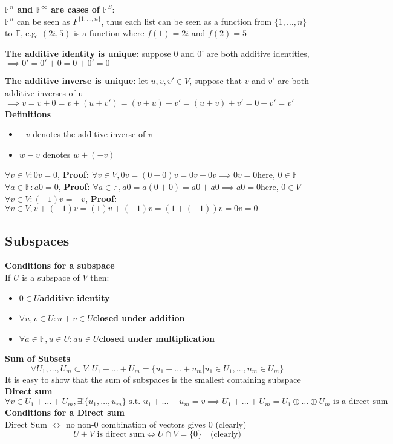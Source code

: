 \documentclass{article}
\newcommand{\0}{{\bf{0}}}
\begin{document}
{\textbf{$\mathbb{F}^n$ and $\mathbb{F}^{\infty}$ are cases of $\mathbb{F}^S:$ }}\\
$\mathbb{F}^n$ can be seen as $F^{\{1,\dots,n\}}$, thus each list can be seen as a function from $\{1,\dots,n\}$ to $\mathbb{F}$, e.g. $(2i,5)$ is a function where $f(1) = 2i$ and $f(2) = 5$

{\textbf{The additive identity is unique:}} suppose 0 and 0' are both additive identities, $\implies0'=0'+0=0+0'=0$

{\textbf{The additive inverse is unique:}} let $u,v,v'\in{}V$, suppose that $v$ and $v'$ are both additive inverses of u $\implies{}v=v+0=v+(u+v')=(v+u)+v'=(u+v)+v'=0+v'=v'$\\
{\textbf{Definitions}}
\begin{itemize}
    \item $-v$ denotes the additive inverse of $v$
    \item $w-v$ denotes $w+(-v)$
\end{itemize}
$\forall{}v\in{}V:0v=0$, {\textbf{Proof:}} $\forall{}v\in{}V,0v=(0+0)v=0v+0v\implies0v=0$\null\hfill{here, $0\in\mathbb{F}$}\\
$\forall{}a\in{}\mathbb{F}:a0=0$, {\textbf{Proof:}} $\forall{}a\in{}\mathbb{F},a0=a(0+0)=a0+a0\implies{}a0=0$\null\hfill{here, $0\in{}V$}\\
$\forall{}v\in{}V:(-1)v=-v$, {\textbf{Proof:}} $\forall{}v\in{}V,v+(-1)v=(1)v+(-1)v=(1+(-1))v=0v=0$
\subsection{Subspaces}
{\textbf{Conditions for a subspace}}\\
If $U$ is a subspace of $V$ then:
\begin{itemize}
    \item $0\in{}U$\null\hfill{\textbf{additive identity}}
    \item $\forall{}u,v\in{}U:u+v\in{}U$\null\hfill{\textbf{closed under addition}}
    \item $\forall{}a\in\mathbb{F},u\in{}U:au\in{}U$\null\hfill{\textbf{closed under multiplication}}
\end{itemize}
{\textbf{Sum of Subsets}}
$$\forall{}U_1,\dots,U_m\subset{}V:U_1+\dots+U_m=\{u_1+\dots+u_m|u_1\in{}U_1,\dots,u_m\in{}U_m\}$$
It is easy to show that the sum of subspaces is the smallest containing subspace\\
\textbf{Direct sum}
$$\forall v\in U_1+\dots+U_m,\exists!\{u_1,\dots,u_m\}\mbox{ s.t. }u_1+\dots+u_m=v\implies\mbox{}U_1+\dots+U_m=U_1\oplus\dots\oplus{}U_m\mbox{ is a direct sum}$$
{\textbf{Conditions for a Direct sum}}\\
Direct Sum $\iff$ no non-$0$ combination of vectors gives $0$ (clearly)
$$U+V\mbox{ is direct sum}\iff{}U\cap{}V=\{0\}\quad\mbox
{(clearly)}$$
\clearpage
\end{document}
